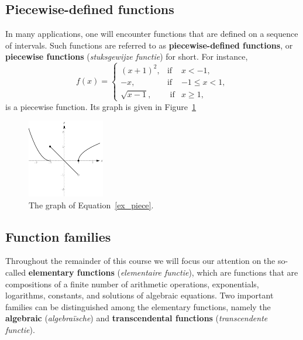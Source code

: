 \subsection{Piecewise-defined functions}\label{stuksgewijs_gedef_functies}
In many applications, one will encounter functions that are defined on a sequence of intervals. Such functions are referred to as \textbf{piecewise-defined functions}, or \textbf{piecewise functions} (\textit{stuksgewijze functie}) for short. For instance, 
\begin{equation}
\label{ex_piece}
f(x) = \left\{\begin{array}{rcl} 
(x+1)^2,  & \mbox{if} & x<-1,\\
-x, & \mbox{if} & -1\leq x<1,\\
\sqrt{x-1}, & \mbox{ if} & x\geq 1,
\end{array}\right. 
\end{equation}
is a piecewise function. Its graph is given in Figure~\ref{fig_functions_30}


\begin{figure}[h!]
	\begin{center}
			\includegraphics[width=0.3\textwidth]{fig_functions_30}
	\caption{The graph of Equation~\eqref{ex_piece}.}
	\label{fig_functions_30}
	\end{center}
\end{figure}


\subsection{Function families}
Throughout the remainder of this course we will focus our attention on the so-called \textbf{elementary functions} (\textit{elementaire functie}), which are functions that are  compositions of a finite number of arithmetic operations, exponentials, logarithms, constants, and solutions of algebraic equations. Two important families can be distinguished among the elementary functions, namely the \textbf{algebraic} (\textit{algebra\"ische}) and \textbf{transcendental functions} (\textit{transcendente functie}).

